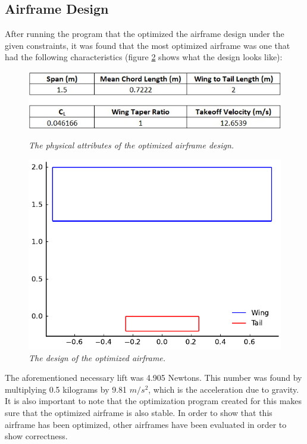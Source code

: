 \documentclass[journal]{new-aiaa}
\begin{document}
	\subsection{Airframe Design}
	
	After running the program that the optimized the airframe design under the given constraints, it was found that the most optimized airframe was one that had the following characteristics (figure \ref{fig:ideal_design} shows what the design looks like):
	
	\begin{figure}[H]
		\centering
		\caption{\emph{The physical attributes of the optimized airframe design.}}
		\includegraphics{../graphics/ideal_attributes.jpg}
		\label{fig:ideal_attr}
	\end{figure}
	
	\begin{figure}[H]
		\centering
		\includegraphics{../graphics/ideal_design.pdf}
		\caption{\emph{The design of the optimized airframe.}}
		\label{fig:ideal_design}
	\end{figure}
	
	The aforementioned necessary lift was 4.905 Newtons. This number was found by multiplying 0.5 kilograms by 9.81 \(m/s^2\), which is the acceleration due to gravity. It is also important to note that the optimization program created for this makes sure that the optimized airframe is also stable. In order to show that this airframe has been optimized, other airframes have been evaluated in order to show correctness.\\
	
\end{document}
